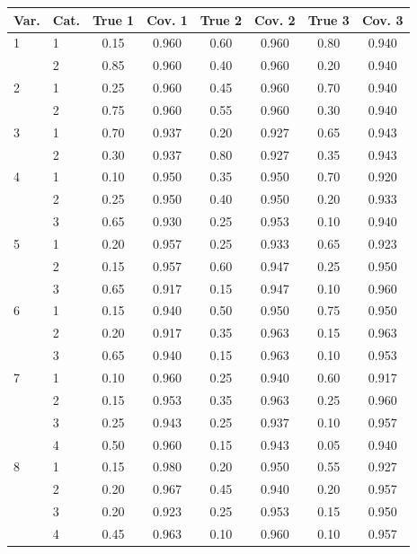\begin{table}[H]
\centering
\begin{tabular}{llcccccc}
  \toprule
\textbf{Var.} & \textbf{Cat.} & \textbf{True 1} & \textbf{Cov. 1} & \textbf{True 2} & \textbf{Cov. 2} & \textbf{True 3} & \textbf{Cov. 3} \\ 
  \midrule
1 & 1 & 0.15 & 0.960 & 0.60 & 0.960 & 0.80 & 0.940 \\ 
   & 2 & 0.85 & 0.960 & 0.40 & 0.960 & 0.20 & 0.940 \\ 
  2 & 1 & 0.25 & 0.960 & 0.45 & 0.960 & 0.70 & 0.940 \\ 
   & 2 & 0.75 & 0.960 & 0.55 & 0.960 & 0.30 & 0.940 \\ 
  3 & 1 & 0.70 & 0.937 & 0.20 & 0.927 & 0.65 & 0.943 \\ 
   & 2 & 0.30 & 0.937 & 0.80 & 0.927 & 0.35 & 0.943 \\ 
  4 & 1 & 0.10 & 0.950 & 0.35 & 0.950 & 0.70 & 0.920 \\ 
   & 2 & 0.25 & 0.950 & 0.40 & 0.950 & 0.20 & 0.933 \\ 
   & 3 & 0.65 & 0.930 & 0.25 & 0.953 & 0.10 & 0.940 \\ 
  5 & 1 & 0.20 & 0.957 & 0.25 & 0.933 & 0.65 & 0.923 \\ 
   & 2 & 0.15 & 0.957 & 0.60 & 0.947 & 0.25 & 0.950 \\ 
   & 3 & 0.65 & 0.917 & 0.15 & 0.947 & 0.10 & 0.960 \\ 
  6 & 1 & 0.15 & 0.940 & 0.50 & 0.950 & 0.75 & 0.950 \\ 
   & 2 & 0.20 & 0.917 & 0.35 & 0.963 & 0.15 & 0.963 \\ 
   & 3 & 0.65 & 0.940 & 0.15 & 0.963 & 0.10 & 0.953 \\ 
  7 & 1 & 0.10 & 0.960 & 0.25 & 0.940 & 0.60 & 0.917 \\ 
   & 2 & 0.15 & 0.953 & 0.35 & 0.963 & 0.25 & 0.960 \\ 
   & 3 & 0.25 & 0.943 & 0.25 & 0.937 & 0.10 & 0.957 \\ 
   & 4 & 0.50 & 0.960 & 0.15 & 0.943 & 0.05 & 0.940 \\ 
  8 & 1 & 0.15 & 0.980 & 0.20 & 0.950 & 0.55 & 0.927 \\ 
   & 2 & 0.20 & 0.967 & 0.45 & 0.940 & 0.20 & 0.957 \\ 
   & 3 & 0.20 & 0.923 & 0.25 & 0.953 & 0.15 & 0.950 \\ 
   & 4 & 0.45 & 0.963 & 0.10 & 0.960 & 0.10 & 0.957 \\ 

\end{tabular}
\end{table}
